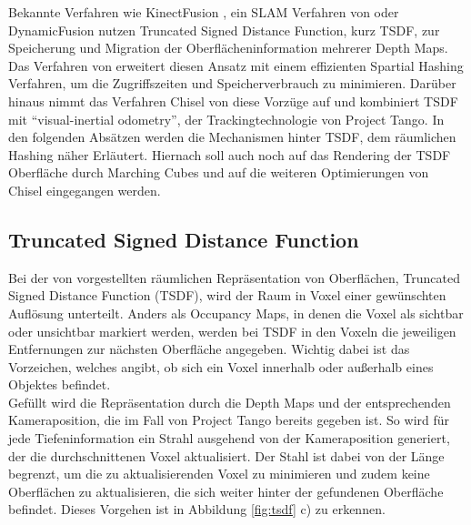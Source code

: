 Bekannte Verfahren wie KinectFusion \citep{newcombe2011kinectfusion}, ein SLAM Verfahren von \citet{bylow2013real} oder DynamicFusion \citep{newcombe2015dynamicfusion} nutzen Truncated Signed Distance Function, kurz TSDF, zur Speicherung und Migration der Oberflächeninformation mehrerer Depth Maps. Das Verfahren von \citet{niessner2013real} erweitert diesen Ansatz mit einem effizienten Spartial Hashing Verfahren, um die Zugriffszeiten und Speicherverbrauch zu minimieren. Darüber hinaus nimmt das Verfahren Chisel von \citep{Klingensmith_2015_7924} diese Vorzüge auf und kombiniert TSDF mit  \enquote{visual-inertial odometry}, der Trackingtechnologie von Project Tango. In den folgenden Absätzen werden die Mechanismen hinter TSDF, dem räumlichen Hashing näher Erläutert. Hiernach soll auch noch auf das Rendering der TSDF Oberfläche durch Marching Cubes und auf die weiteren Optimierungen von Chisel eingegangen werden. \\


\subsection{Truncated Signed Distance Function}

Bei der von \citet{curless1996volumetric} vorgestellten räumlichen Repräsentation von Oberflächen, Truncated Signed Distance Function (TSDF), wird der Raum in Voxel einer gewünschten Auflösung unterteilt. Anders als Occupancy Maps, in denen die Voxel als sichtbar oder unsichtbar markiert werden, werden bei TSDF in den Voxeln die jeweiligen Entfernungen zur nächsten Oberfläche angegeben. Wichtig dabei ist das Vorzeichen, welches angibt, ob sich ein Voxel innerhalb oder außerhalb eines Objektes befindet.  \citep{curless1996volumetric} \\

Gefüllt wird die Repräsentation durch die Depth Maps und der entsprechenden Kameraposition, die im Fall von Project Tango bereits gegeben ist. So wird für jede Tiefeninformation ein Strahl ausgehend von der Kameraposition generiert, der die durchschnittenen Voxel aktualisiert. Der Stahl ist dabei von der Länge begrenzt, um die zu aktualisierenden Voxel zu minimieren und zudem keine Oberflächen zu aktualisieren, die sich weiter hinter der gefundenen Oberfläche befindet. Dieses Vorgehen ist in Abbildung \ref{fig:tsdf} c) zu erkennen. \citep{Compu66:online} \\

